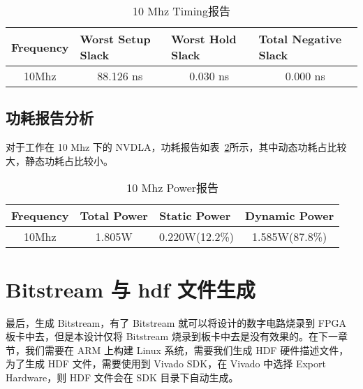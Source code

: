 \begin{table}[!htbp]
    \caption{10 Mhz Timing报告}
    \label{tab:10Mhz Timing}
    \centering
    \footnotesize%
    \setlength{\tabcolsep}{4pt}%
    \renewcommand{\arraystretch}{1.2}%
    \begin{tabular}{llll}
        \toprule
        \textbf{Frequency}        & \textbf{Worst Setup Slack}    & \textbf{Worst Hold Slack}    & \textbf{Total Negative Slack} \\
        \midrule
        \multicolumn{1}{c}{10Mhz} & \multicolumn{1}{c}{88.126 ns} & \multicolumn{1}{c}{0.030 ns} & \multicolumn{1}{c}{0.000 ns} \\
        \bottomrule                   
    \end{tabular}
\end{table}


\subsection{功耗报告分析}

对于工作在 10 Mhz 下的 NVDLA，功耗报告如表~\ref{tab:10Mhz Power}所示，其中动态功耗占比较大，静态功耗占比较小。

\begin{table}[!htbp]
    \caption{10 Mhz Power报告}
    \label{tab:10Mhz Power}
    \centering
    \footnotesize%
    \setlength{\tabcolsep}{4pt}%
    \renewcommand{\arraystretch}{1.2}%
    \begin{tabular}{llll}
        \toprule
        \textbf{Frequency}        & \textbf{Total Power}       & \textbf{Static Power}            & \textbf{Dynamic Power}           \\
        \midrule
        \multicolumn{1}{c}{10Mhz} & \multicolumn{1}{c}{1.805W} & \multicolumn{1}{c}{0.220W(12.2\%)} & \multicolumn{1}{c}{1.585W(87.8\%)} \\
        \bottomrule                   
    \end{tabular}
\end{table}

\section{Bitstream 与 hdf 文件生成}

最后，生成 Bitstream，有了 Bitstream 就可以将设计的数字电路烧录到 FPGA 板卡中去，但是本设计仅将 Bitstream 烧录到板卡中去是没有效果的。在下一章节，我们需要在 ARM 上构建 Linux 系统，需要我们生成 HDF 硬件描述文件，为了生成 HDF 文件，需要使用到 Vivado SDK，在 Vivado 中选择 Export Hardware，则 HDF 文件会在 SDK 目录下自动生成。








